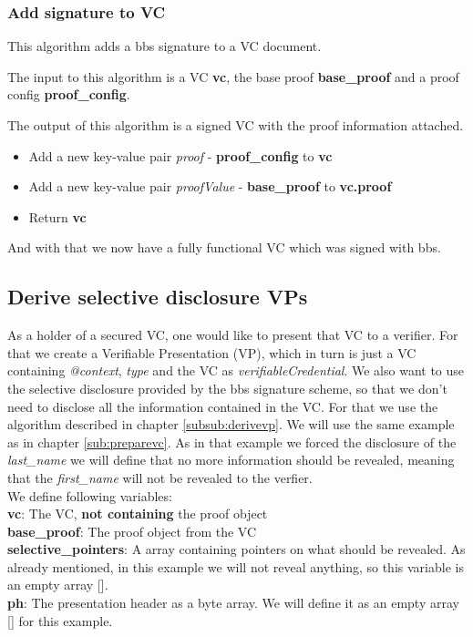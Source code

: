 \documentclass[
	a4paper               %
	,bibliography=totoc   %
	,listof=totoc         %
	,monolingual
	twoside=false,
]{bfhthesis}              %
\begin{document}
\subsubsection{Add signature to VC}
\label{subsubsec:signed}
This algorithm adds a bbs signature to a VC document.

The input to this algorithm is a VC \textbf{vc}, the base proof \textbf{base\_proof} and a proof config \textbf{proof\_config}.

The output of this algorithm is a signed VC with the proof information attached.

\begin{itemize}
	\item Add a new key-value pair \textit{proof} - \textbf{proof\_config} to \textbf{vc}
	\item Add a new key-value pair \textit{proofValue} - \textbf{base\_proof} to \textbf{vc.proof}
	\item Return \textbf{vc}
\end{itemize}

And with that we now have a fully functional VC which was signed with bbs.

\subsection{Derive selective disclosure VPs}
As a holder of a secured VC, one would like to present that VC to a verifier.
For that we create a Verifiable Presentation (VP), which in turn is just a VC containing \textit{@context}, \textit{type} and the VC as \textit{verifiableCredential}.
We also want to use the selective disclosure provided by the bbs signature scheme, so that we don't need to disclose all the information contained in the VC.
For that we use the algorithm described in chapter \ref{subsub:derivevp}.
We will use the same example as in chapter \ref{sub:preparevc}.
As in that example we forced the disclosure of the \textit{last\_name} we will define that no more information should be revealed, meaning that the \textit{first\_name} will not be revealed to the verfier.\\

We define following variables:\\
\textbf{vc}: The VC, \textbf{not containing} the proof object\\
\textbf{base\_proof}: The proof object from the VC\\
\textbf{selective\_pointers}: A array containing pointers on what should be revealed. As already mentioned, in this example we will not reveal anything, so this variable is an empty array [].\\
\textbf{ph}: The presentation header as a byte array. We will define it as an empty array [] for this example.\\
\end{document}
